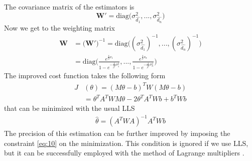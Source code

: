 \documentclass[12pt,twoside]{report}
\begin{document}
The covariance matrix of the estimators is $$\mathbf{W}'=\text{diag}\big(\sigma^2_{\hat{d_1}},...,\sigma^2_{\hat{d_n}}\big)$$
Now we get to the weighting matrix
\begin{align}
    \mathbf{W}&=\big(\mathbf{W'}\big)^{-1}=\text{diag}\big((\sigma^2_{\hat{d_1}})^{-1},...,(\sigma^2_{\hat{d_n}})^{-1}\big)\\
    &=\text{diag}\bigg(\frac{e^{\frac{4}{\beta}\nu_1}}{1-e^{-\frac{4}{\beta^2}\sigma^2_1}},...,\frac{e^{\frac{4}{\beta}\nu_n}}{1-e^{-\frac{4}{\beta^2}\sigma^2_n}}\bigg)
\end{align}
The improved cost function \cite{rzk} takes the following form 
\begin{align}
    J&(\theta)=(M\theta - b)^TW(M\theta - b)\\
    &=\theta^TA^TWM\theta-2\theta^TA^TWb+b^TWb
\end{align}
that can be minimized with the usual LLS
\begin{align}
    \hat{\theta}=(A^TWA)^{-1}A^TWb
\end{align}
The precision of this estimation can be further improved by imposing the constraint \ref{eq:10} on the minimization. This condition is ignored if we use LLS, but it can be successfully employed with the method of Lagrange multipliers \cite{1275684,Lopez1994, pasa}.


\clearpage
\end{document}
